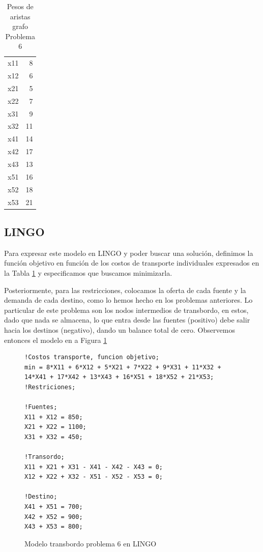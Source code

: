\documentclass[12pt]{article}  %
\begin{document}
\begin{table}[H]
\centering
\caption{Pesos de aristas grafo Problema 6}
\label{tab:PesosProb6}
\begin{tabular}{lr}
x11 & 8 \\
x12 & 6 \\
x21 & 5 \\
x22 & 7 \\
x31 & 9 \\
x32 & 11 \\
x41 & 14 \\
x42 & 17 \\
x43 & 13 \\
x51 & 16 \\
x52 & 18 \\
x53 & 21
\end{tabular}
\end{table}

\subsection{LINGO}
Para expresar este modelo en LINGO y poder buscar una solución, definimos la función objetivo en función de los costos de transporte individuales expresados en la Tabla \ref{tab:PesosProb6} y especificamos que buscamos minimizarla.

Posteriormente, para las restricciones, colocamos la oferta de cada fuente y la demanda de cada destino, como lo hemos hecho en los problemas anteriores. Lo particular de este problema son los nodos intermedios de transbordo, en estos, dado que nada se almacena, lo que entra desde las fuentes (positivo) debe salir hacia los destinos (negativo), dando un balance total de cero. Observemos entonces el modelo en a Figura \ref{fig:lingoProb6}

\begin{figure}[H]
	\centering
	\caption{Modelo transbordo problema 6 en LINGO}
	\label{fig:lingoProb6}
	\begin{verbatim}
!Costos transporte, funcion objetivo;
min = 8*X11 + 6*X12 + 5*X21 + 7*X22 + 9*X31 + 11*X32 +
14*X41 + 17*X42 + 13*X43 + 16*X51 + 18*X52 + 21*X53;
!Restriciones;

!Fuentes;
X11 + X12 = 850;
X21 + X22 = 1100;
X31 + X32 = 450;

!Transordo;
X11 + X21 + X31 - X41 - X42 - X43 = 0;
X12 + X22 + X32 - X51 - X52 - X53 = 0;

!Destino;
X41 + X51 = 700;
X42 + X52 = 900;
X43 + X53 = 800;
	\end{verbatim}
\end{figure}
\end{document}
